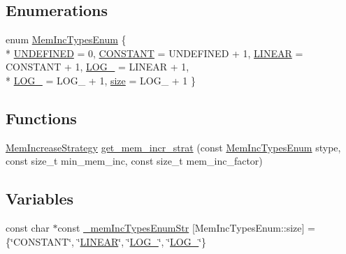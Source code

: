 \subsection*{Enumerations}
\begin{DoxyCompactItemize}
\item 
enum \hyperlink{namespaceuva_1_1utils_1_1containers_aea6a0a858974dd7edb4227dcbcbc1eb6}{Mem\+Inc\+Types\+Enum} \{ \\*
\hyperlink{namespaceuva_1_1utils_1_1containers_aea6a0a858974dd7edb4227dcbcbc1eb6a378c848dc111a9fb0be352f3e73caaf5}{U\+N\+D\+E\+F\+I\+N\+E\+D} = 0, 
\hyperlink{namespaceuva_1_1utils_1_1containers_aea6a0a858974dd7edb4227dcbcbc1eb6a2e97241bf53f5da01ef85f408863370d}{C\+O\+N\+S\+T\+A\+N\+T} = U\+N\+D\+E\+F\+I\+N\+E\+D + 1, 
\hyperlink{namespaceuva_1_1utils_1_1containers_aea6a0a858974dd7edb4227dcbcbc1eb6aef7537589dc0f411a7215b5904b21073}{L\+I\+N\+E\+A\+R} = C\+O\+N\+S\+T\+A\+N\+T + 1, 
\hyperlink{namespaceuva_1_1utils_1_1containers_aea6a0a858974dd7edb4227dcbcbc1eb6a8ca02671080014d040d3d1c7db41b447}{L\+O\+G\+\_} = L\+I\+N\+E\+A\+R + 1, 
\\*
\hyperlink{namespaceuva_1_1utils_1_1containers_aea6a0a858974dd7edb4227dcbcbc1eb6aa0517306d9991f24d02b23c2df9ac368}{L\+O\+G\+\_} = L\+O\+G\+\_ + 1, 
\hyperlink{namespaceuva_1_1utils_1_1containers_aea6a0a858974dd7edb4227dcbcbc1eb6a0be5bdf7cf8c7c58d0bc5678caa07791}{size} = L\+O\+G\+\_ + 1
 \}
\end{DoxyCompactItemize}
\subsection*{Functions}
\begin{DoxyCompactItemize}
\item 
\hyperlink{classuva_1_1utils_1_1containers_1_1_mem_increase_strategy}{Mem\+Increase\+Strategy} \hyperlink{namespaceuva_1_1utils_1_1containers_af28472cb52d5ebfb2006a085f3da586e}{get\+\_\+mem\+\_\+incr\+\_\+strat} (const \hyperlink{namespaceuva_1_1utils_1_1containers_aea6a0a858974dd7edb4227dcbcbc1eb6}{Mem\+Inc\+Types\+Enum} stype, const size\+\_\+t min\+\_\+mem\+\_\+inc, const size\+\_\+t mem\+\_\+inc\+\_\+factor)
\end{DoxyCompactItemize}
\subsection*{Variables}
\begin{DoxyCompactItemize}
\item 
const char $\ast$const \hyperlink{namespaceuva_1_1utils_1_1containers_a3564ed64f86d53a5879c1ec2e49908f9}{\+\_\+mem\+Inc\+Types\+Enum\+Str} \mbox{[}Mem\+Inc\+Types\+Enum\+::size\mbox{]} = \{\char`\"{}C\+O\+N\+S\+T\+A\+N\+T\char`\"{}, \char`\"{}\hyperlink{namespaceuva_1_1utils_1_1containers_aea6a0a858974dd7edb4227dcbcbc1eb6aef7537589dc0f411a7215b5904b21073}{L\+I\+N\+E\+A\+R}\char`\"{}, \char`\"{}\hyperlink{namespaceuva_1_1utils_1_1containers_aea6a0a858974dd7edb4227dcbcbc1eb6a8ca02671080014d040d3d1c7db41b447}{L\+O\+G\+\_}\char`\"{}, \char`\"{}\hyperlink{namespaceuva_1_1utils_1_1containers_aea6a0a858974dd7edb4227dcbcbc1eb6aa0517306d9991f24d02b23c2df9ac368}{L\+O\+G\+\_}\char`\"{}\}
\end{DoxyCompactItemize}


